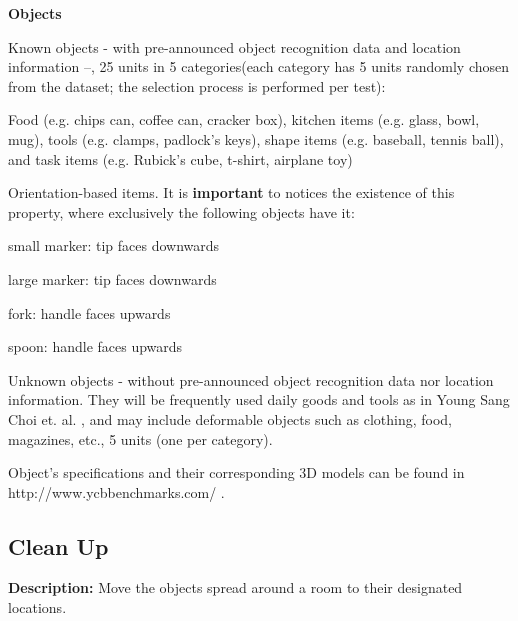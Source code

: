\documentclass{article}
\newcommand{\SubItem}[1]{
    {\setlength\itemindent{15pt} \item[-] #1}
}
\begin{document}
\noindent
\textbf{Objects}
\begin{itemize}
    \item Known objects - with pre-announced object recognition data and location information --, 25 units in 5 categories\footnotemark (each category has 5 units randomly chosen from the dataset; the selection process is performed per test): 
        \SubItem{Food (e.g. chips can, coffee can, cracker box), kitchen items (e.g. glass, bowl, mug), tools (e.g. clamps, padlock's keys), shape items (e.g. baseball, tennis ball), and task items (e.g. Rubick’s cube, t-shirt, airplane toy)}
    \item Orientation-based items. It is \textbf{important} to notices the existence of this property, where exclusively the following objects have it: 
        \SubItem{small marker: tip faces downwards}
        \SubItem{large marker: tip faces downwards}
        \SubItem{fork: handle faces upwards}
        \SubItem{spoon: handle faces upwards}
    \item Unknown objects - without pre-announced object recognition data nor location information. They will be frequently used daily goods and tools as in Young Sang Choi et. al. \footnotemark, and may include deformable objects such as clothing, food, magazines, etc., 5 units (one per category). 
\end{itemize}




Object's specifications and their corresponding 3D models can be found in http://www.ycbbenchmarks.com/ .

\clearpage
\subsection{Clean Up}

\textbf{Description:} Move the objects spread around a room to their designated locations.
\end{document}
